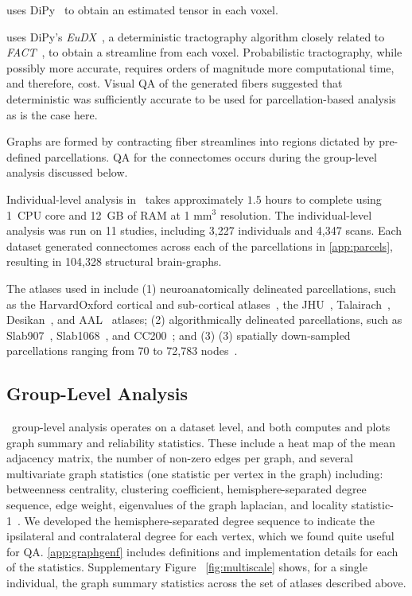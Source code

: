\documentclass[11pt]{article}
\begin{document}
\begin{multicols}{2}
\begin{description}[style=unboxed,leftmargin=0cm]
    \item[Tensor Estimation] uses DiPy~\cite{dipy} to obtain an estimated tensor in each voxel.

    \item[Tractography] uses DiPy's \textit{EuDX}~\cite{eudx}, a deterministic tractography algorithm closely related to \textit{FACT}~\cite{fact}, to obtain a streamline from each voxel.
    Probabilistic tractography, while possibly more accurate, requires orders of magnitude more computational time, and therefore, cost.
    Visual QA of the generated fibers suggested that deterministic was sufficiently accurate to be used for parcellation-based analysis as is the case here.

    \item[Graph Generation] Graphs are formed by contracting fiber streamlines into regions dictated by pre-defined parcellations.
    QA for the connectomes occurs during the group-level analysis discussed below.
\end{description}

Individual-level analysis in \ndmg~takes approximately $1.5$ hours to complete using 1~CPU core and 12~GB of RAM at 1 mm$^3$ resolution.
The individual-level analysis was run on 11 studies, including 3,227 individuals and 4,347 scans.
Each dataset generated connectomes across each of the parcellations in \ref{app:parcels}, resulting in 104,328 structural brain-graphs.

The atlases used in \ndmg include (1) neuroanatomically delineated parcellations, such as the HarvardOxford cortical and sub-cortical atlases~\cite{harvardoxford}, the JHU~\cite{jhu}, Talairach~\cite{talairach}, Desikan~\cite{desikan}, and AAL~\cite{aal} atlases; (2) algorithmically delineated parcellations, such as Slab907~\cite{slab907}, Slab1068~\cite{slab1068}, and CC200~\cite{cpac};  and (3) (3) spatially down-sampled parcellations ranging from 70 to 72,783 nodes~\cite{glocal}.




\subsection{Group-Level Analysis}

\ndmg~group-level analysis operates on a dataset level, and both computes and plots graph summary and reliability statistics.
These include a heat map of the mean adjacency matrix, the number of non-zero edges per graph, and several multivariate graph statistics (one statistic per vertex in the graph) including:  betweenness centrality, clustering coefficient, hemisphere-separated degree sequence, edge weight, eigenvalues of the graph laplacian, and locality statistic-1~\cite{glocal}.
We developed the hemisphere-separated degree sequence to indicate the ipsilateral and contralateral degree for each vertex, which we found quite useful for QA.
\ref{app:graphgenf} includes definitions and implementation details for each of the statistics.
Supplementary Figure ~\ref{fig:multiscale} shows, for a single individual, the graph summary statistics across the set of atlases described above.



\end{multicols}
\end{document}
